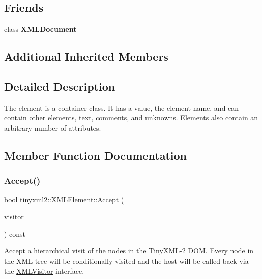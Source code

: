 \subsection*{Friends}
\begin{DoxyCompactItemize}
\item 
\mbox{\label{classtinyxml2_1_1_x_m_l_element_a4eee3bda60c60a30e4e8cd4ea91c4c6e}} 
class {\bfseries X\+M\+L\+Document}
\end{DoxyCompactItemize}
\subsection*{Additional Inherited Members}


\subsection{Detailed Description}
The element is a container class. It has a value, the element name, and can contain other elements, text, comments, and unknowns. Elements also contain an arbitrary number of attributes. 

\subsection{Member Function Documentation}
\mbox{\label{classtinyxml2_1_1_x_m_l_element_a9b2119831e8b85827d5d3e5076788e4a}} 
\subsubsection{\texorpdfstring{Accept()}{Accept()}}
{\footnotesize\ttfamily bool tinyxml2\+::\+X\+M\+L\+Element\+::\+Accept (\begin{DoxyParamCaption}\item[{\hyperlink{classtinyxml2_1_1_x_m_l_visitor}{X\+M\+L\+Visitor} $\ast$}]{visitor }\end{DoxyParamCaption}) const\hspace{0.3cm}{\ttfamily [virtual]}}

Accept a hierarchical visit of the nodes in the Tiny\+X\+M\+L-\/2 D\+OM. Every node in the X\+ML tree will be conditionally visited and the host will be called back via the \hyperlink{classtinyxml2_1_1_x_m_l_visitor}{X\+M\+L\+Visitor} interface.

